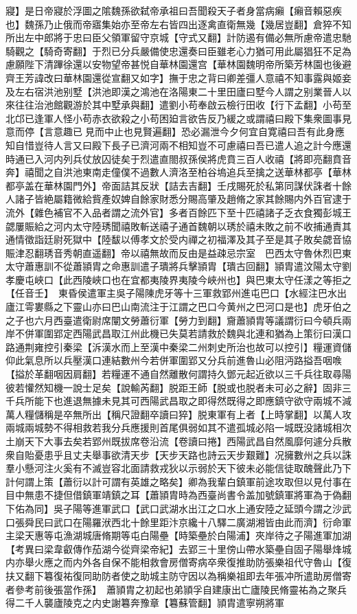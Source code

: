 寢】是日帝寢於浮圖之隂魏孫欲弑帝承祖曰吾聞殺天子者身當病癩【癩音賴惡疾也】魏孫乃止俄而帝寤集始亦至帝左右皆四出逐禽直衛無幾【幾居豈翻】倉猝不知所出左中郎將于忠曰臣父領軍留守京城【守式又翻】計防遏有備必無所慮帝遣忠馳騎觀之【騎奇寄翻】于烈已分兵嚴備使忠還奏曰臣雖老心力猶可用此屬猖狂不足為慮願陛下清蹕徐還以安物望帝甚悦自華林園還宫【華林園魏明帝所築芳林園也後避齊王芳諱改曰華林園還從宣翻又如字】撫于忠之背曰卿差彊人意禧不知事露與姬妾及左右宿洪池别墅【洪池即漢之鴻池在洛陽東二十里田廬曰墅今人謂之别業晉人以來往往治池館觀游於其中墅承與翻】遣劉小苟奉啟云檢行田收【行下孟翻】小苟至北邙已逢軍人怪小苟赤衣欲殺之小苟困廹言欲告反乃緩之或謂禧曰殿下集衆圖事見意而停【言意趣已見而中止也見賢遍翻】恐必漏泄今夕何宜自寛禧曰吾有此身應知自惜豈待人言又曰殿下長子已濟河兩不相知豈不可慮禧曰吾已遣人追之計今應還時通已入河内列兵仗放囚徒矣于烈遣直閤叔孫侯將虎賁三百人收禧【將即亮翻賁音奔】禧聞之自洪池東南走僮僕不過數人濟洛至柏谷塢追兵至擒之送華林都亭【華林都亭盖在華林園門外】帝面詰其反狀【詰去吉翻】壬戌賜死於私第同謀伏誅者十餘人諸子皆絶屬籍微給貲產奴婢自餘家財悉分賜高肇及趙脩之家其餘賜内外百官逮于流外【雜色補官不入品者謂之流外官】多者百餘匹下至十匹禧諸子乏衣食獨彭城王勰屢賑給之河内太守陸琇聞禧敗斬送禧子通首魏朝以琇於禧未敗之前不收捕通責其通情徵詣廷尉死獄中【陸馛以傅孝文於受内禪之初福澤及其子至是其子敗矣勰音協賑津忍翻琇音秀朝直遥翻】帝以禧無故而反由是益疎忌宗室　巴西太守魯休烈巴東太守蕭惠訓不從蕭頴胄之命惠訓遣子璝將兵擊頴胄【璝古回翻】頴胄遣汶陽太守劉孝慶屯峽口【此西陵峽口也在宜都夷陵界夷陵今峽州也】與巴東太守任漾之等拒之【任音壬】　東昏侯遣軍主吳子陽陳虎牙等十三軍救郢州進屯巴口【水經注巴水出廬江雩婁縣之下靈山亦曰巴山南流注于江謂之巴口今黄州之巴河口是也】虎牙伯之之子也六月西臺遣衛尉席闡文勞蕭衍軍【勞力到翻】齎蕭頴胄等議謂衍曰今頓兵兩岸不併軍圍郢定西陽武昌取江州此機已失莫若請救於魏與北連和猶為上策衍曰漢口路通荆雍控引秦梁【泝漢水而上至漢中秦梁二州刺史所治也故可以控引】糧運資儲仰此氣息所以兵壓漢口連結數州今若併軍圍郢又分兵前進魯山必阻沔路搤吾咽㗋【搤於革翻咽因肩翻】若糧運不通自然離散何謂持久鄧元起近欲以三千兵往取尋陽彼若懽然知機一說士足矣【說輸芮翻】脱距王師【脱或也脱者未可必之辭】固非三千兵所能下也進退無據未見其可西陽武昌取之即得然既得之即應鎮守欲守兩城不減萬人糧儲稱是卒無所出【稱尺證翻卒讀曰猝】脱東軍有上者【上時掌翻】以萬人攻兩城兩城勢不得相救若我分兵應援則首尾俱弱如其不遣孤城必陷一城既没諸城相次土崩天下大事去矣若郢州既拔席卷沿流【卷讀曰捲】西陽武昌自然風靡何遽分兵散衆自貽憂患乎且丈夫舉事欲清天步【天步天路也詩云天步艱難】况擁數州之兵以誅羣小懸河注火奚有不滅豈容北面請救戎狄以示弱於天下彼未必能信徒取醜聲此乃下計何謂上策【蕭衍以計可謂有英雄之略矣】卿為我輩白鎮軍前途攻取但以見付事在目中無患不捷但借鎮軍靖鎮之耳【蕭頴胄時為西臺尚書令盖加號鎮軍將軍為于偽翻下佑為同】吳子陽等進軍武口【武口武湖水出江之口水上通安陸之延頭今謂之沙武口張舜民曰武口在陽羅洑西北十餘里距汴京纔十八驛二廣湖湘皆由此而濟】衍命軍主梁天惠等屯漁湖城唐脩期等屯白陽壘【時築壘於白陽浦】夾岸待之子陽進軍加湖　【考異曰梁韋叡傳作茄湖今從齊梁帝紀】去郢三十里傍山帶水築壘自固子陽舉烽城内亦舉火應之而内外各自保不能相救會房僧寄病卒衆復推助防張樂祖代守魯山【復扶又翻下篹復祐復同助防者使之助城主防守因以為稱樂祖即去年張冲所遣助房僧寄者參考前後張當作孫】　蕭頴胄之初起也弟頴孚自建康出亡廬陵民脩靈祐為之聚兵得二千人襲廬陵克之内史謝篹奔豫章【篹蘇管翻】頴胄遣寧朔將軍